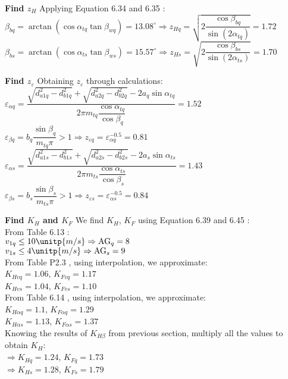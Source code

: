 \textbf{Find $ z_H $} Applying Equation 6.34 \cite{tk1} and 6.35 \cite{tk1}:\\
$ \beta_{bq} = \arctan\left( \cos\alpha_{tq}\tan\beta_{wq}\right) = 13.08^\circ \Rightarrow z_{Hq} = \sqrt{2\dfrac{\cos\beta_{bq}}{\sin(2\alpha_{tq})}} = 1.72$\\
$ \beta_{bs} = \arctan\left( \cos\alpha_{ts}\tan\beta_{ws}\right) = 15.57^\circ \Rightarrow z_{Hs} = \sqrt{2\dfrac{\cos\beta_{bs}}{\sin(2\alpha_{ts})}} = 1.70$

\textbf{Find $ z_\varepsilon $} Obtaining $ z_\varepsilon $ through calculations:\\
$ \varepsilon_{\alpha q} = \dfrac{\sqrt{d_{a1q}^2-d_{b1q}^2}+\sqrt{d_{a2q}^2-d_{b2q}^2}-2a_{q}\sin\alpha_{tq}}{2\pi m_{tq}\dfrac{\cos\alpha_{tq}}{\cos\beta_q}} = 1.52$\\
$ \varepsilon_{\beta q} = b_q\dfrac{\sin\beta_q}{m_{tq}\pi} >1 \Rightarrow z_{\varepsilon q} = \varepsilon_{\alpha q}^{-0.5} = 0.81 $\\
$ \varepsilon_{\alpha s} = \dfrac{\sqrt{d_{a1s}^2-d_{b1s}^2}+\sqrt{d_{a2s}^2-d_{b2s}^2}-2a_{s}\sin\alpha_{ts}}{2\pi m_{ts}\dfrac{\cos\alpha_{ts}}{\cos\beta_s}} = 1.43$\\
$ \varepsilon_{\beta s} = b_s\dfrac{\sin\beta_s}{m_{ts}\pi} >1 \Rightarrow z_{\varepsilon s} = \varepsilon_{\alpha s}^{-0.5} = 0.84 $

\textbf{Find $ K_H $ and $ K_F $} We find $ K_H $, $ K_F $ using Equation 6.39 and 6.45 \cite{tk1}:\\
From Table 6.13 \cite{tk1}:\\
$ v_{1q}\leq 10 \unitp{m/s}\Rightarrow \text{AG}_q = 8 $ \\
$ v_{1s}\leq 4 \unitp{m/s}\Rightarrow \text{AG}_s = 9 $ \\
From Table P2.3 \cite{tk1}, using interpolation, we approximate:\\
$ K_{Hvq} = 1.06$, $ K_{Fvq} = 1.17$\\
$ K_{Hvs} = 1.04$, $ K_{Fvs} = 1.10$\\
From Table 6.14 \cite{tk1}, using interpolation, we approximate:\\
$ K_{H\alpha q} = 1.1$, $ K_{F\alpha q} = 1.29 $ \\
$ K_{H\alpha s} = 1.13$, $ K_{F\alpha s} = 1.37 $ \\		
Knowing the results of $ K_{H\beta} $ from previous section, multiply all the values to obtain $ K_H $:\\
$ \Rightarrow K_{Hq} = 1.24 $, $ K_{Fq} = 1.73 $\\
$ \Rightarrow K_{Hs} = 1.28 $, $ K_{Fs} = 1.79 $

